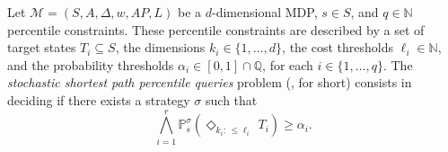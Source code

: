 \begin{definition}\label{ssppq-example-1}
  Let $\mathcal{M}=(S, A, \Delta, w, AP, L)$ be a $d$-dimensional MDP, $s \in S$, and $q \in \mathbb{N}$ percentile constraints. These percentile constraints are described by a set of target states $T_i \subseteq S$, the dimensions $k_i \in \{1, \dots, d\}$, the cost thresholds $\ell_i \in \mathbb{N}$, and the probability thresholds $\alpha_i \in [0, 1] \cap \mathbb{Q}$, for each $i \in \{1, \dots, q\}$.
  The \textit{stochastic shortest path percentile queries} problem (\SSPPQ{}, for short) consists in deciding if there exists a strategy $\sigma$ such that
  \[
    \bigwedge_{i=1}^r \mathbb{P}^\sigma_s(\Diamond_{k_i:\, \leq \ell_i}\, T_i) \geq \alpha_i.
  \]
\end{definition}

